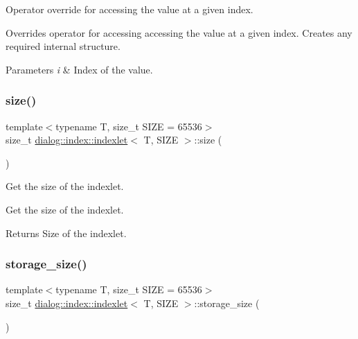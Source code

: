 Operator override for accessing the value at a given index. 

Overrides operator for accessing accessing the value at a given index. Creates any required internal structure.


\begin{DoxyParams}{Parameters}
{\em i} & Index of the value. \\
\hline
\end{DoxyParams}
\mbox{\label{classdialog_1_1index_1_1indexlet_ade4239f0aba692226fb8dd9ff899df87}} 
\subsubsection{\texorpdfstring{size()}{size()}}
{\footnotesize\ttfamily template$<$typename T, size\+\_\+t S\+I\+ZE = 65536$>$ \\
size\+\_\+t \hyperlink{classdialog_1_1index_1_1indexlet}{dialog\+::index\+::indexlet}$<$ T, S\+I\+ZE $>$\+::size (\begin{DoxyParamCaption}{ }\end{DoxyParamCaption})\hspace{0.3cm}{\ttfamily [inline]}}



Get the size of the indexlet. 

Get the size of the indexlet. \begin{DoxyReturn}{Returns}
Size of the indexlet. 
\end{DoxyReturn}
\mbox{\label{classdialog_1_1index_1_1indexlet_a68a3f311fb6b2172c70619bc633e729b}} 
\subsubsection{\texorpdfstring{storage\+\_\+size()}{storage\_size()}}
{\footnotesize\ttfamily template$<$typename T, size\+\_\+t S\+I\+ZE = 65536$>$ \\
size\+\_\+t \hyperlink{classdialog_1_1index_1_1indexlet}{dialog\+::index\+::indexlet}$<$ T, S\+I\+ZE $>$\+::storage\+\_\+size (\begin{DoxyParamCaption}{ }\end{DoxyParamCaption})\hspace{0.3cm}{\ttfamily [inline]}}



